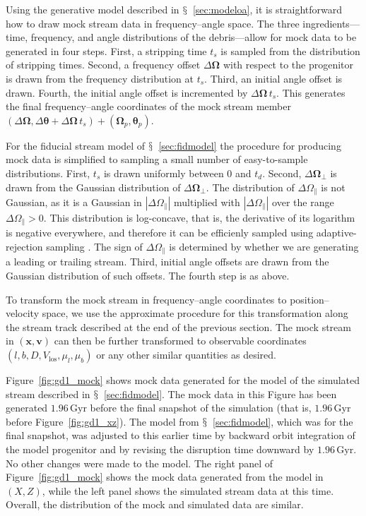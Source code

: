 \documentclass[12pt,preprint]{aastex}
\renewcommand{\figurename}{Figure}
\newcommand{\sectionname}{$\mathsection$}
\renewcommand{\vec}[1]{\ensuremath{\mathbf{#1}}}
\newcommand{\vecx}{\ensuremath{\vec{x}}}
\newcommand{\vecv}{\ensuremath{\vec{v}}}
\newcommand{\veco}{\ensuremath{\vec{\Omega}}}
\newcommand{\veca}{\ensuremath{\boldsymbol\theta}}
\newcommand{\Gyr}{\ensuremath{\,\mathrm{Gyr}}}
\newcommand{\opar}{\ensuremath{\Omega_\parallel}}
\newcommand{\operp}{\ensuremath{\veco_\perp}}
\newcommand{\vlos}{\ensuremath{V_{\mathrm{los}}}}
\newcommand{\pmll}{\ensuremath{\mu_l}}
\newcommand{\pmbb}{\ensuremath{\mu_b}}
\begin{document}
Using the generative model described in
\sectionname~\ref{sec:modeloa}, it is straightforward how to draw mock
stream data in frequency--angle space. The three ingredients---time,
frequency, and angle distributions of the debris---allow for mock data
to be generated in four steps. First, a stripping time $t_s$ is
sampled from the distribution of stripping times. Second, a frequency
offset $\Delta \veco$ with respect to the progenitor is drawn from the
frequency distribution at $t_s$. Third, an initial angle offset is
drawn. Fourth, the initial angle offset is incremented by $\Delta
\veco \,t_s$. This generates the final frequency--angle coordinates of
the mock stream member $(\Delta \veco,\Delta \veca+\Delta \veco\,t_s)
+ (\veco_p,\veca_p)$.

For the fiducial stream model of \sectionname~\ref{sec:fidmodel} the
procedure for producing mock data is simplified to sampling a small
number of easy-to-sample distributions. First, $t_s$ is drawn
uniformly between $0$ and $t_d$. Second, $\Delta \operp$ is drawn from
the Gaussian distribution of $\Delta \operp$. The distribution of
$\Delta \opar$ is not Gaussian, as it is a Gaussian in $|\Delta
\opar|$ multiplied with $|\Delta \opar|$ over the range $\Delta \opar
> 0$. This distribution is log-concave, that is, the derivative of its
logarithm is negative everywhere, and therefore it can be efficienly
sampled using adaptive-rejection sampling \citep{Gilks92a}. The sign
of $\Delta \opar$ is determined by whether we are generating a leading
or trailing stream. Third, initial angle offsets are drawn from the
Gaussian distribution of such offsets. The fourth step is as above.

To transform the mock stream in frequency--angle coordinates to
position--velocity space, we use the approximate procedure for this
transformation along the stream track described at the end of the
previous section. The mock stream in $(\vecx,\vecv)$ can then be
further transformed to observable coordinates
$(l,b,D,\vlos,\pmll,\pmbb)$ or any other similar quantities as
desired.

\figurename~\ref{fig:gd1_mock} shows mock data generated for the model
of the simulated stream described in
\sectionname~\ref{sec:fidmodel}. The mock data in this Figure has been
generated $1.96\Gyr$ before the final snapshot of the simulation (that
is, $1.96\Gyr$ before \figurename~\ref{fig:gd1_xz}). The model
from \sectionname~\ref{sec:fidmodel}, which was for the final
snapshot, was adjusted to this earlier time by backward orbit
integration of the model progenitor and by revising the disruption
time downward by $1.96\Gyr$. No other changes were made to the
model. The right panel of \figurename~\ref{fig:gd1_mock} shows the
mock data generated from the model in $(X,Z)$, while the left panel
shows the simulated stream data at this time. Overall, the
distribution of the mock and simulated data are similar.
\end{document}
